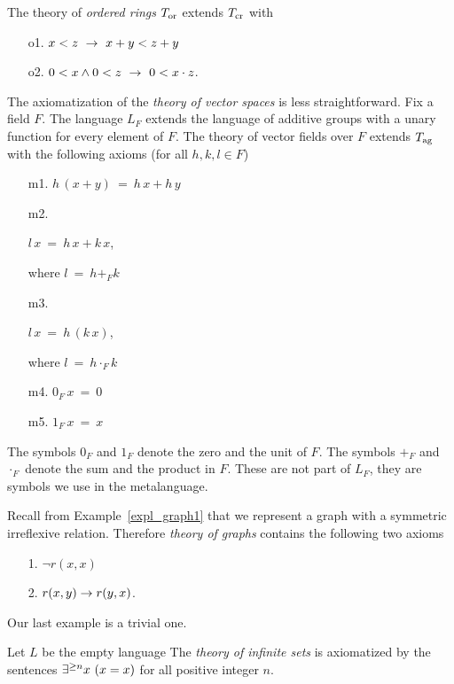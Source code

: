 \begin{example}
The theory of \emph{ordered rings} $T_{\rm or}$ extends $T_{\rm cr}$ with
\begin{itemize}
\item[o1.] $x<z\ \rightarrow\ x+y<z+y$
\item[o2.] $0<x \wedge 0<z\ \rightarrow\ 0<x\cdot z$.
\end{itemize}
\end{example}

\begin{example}\label{ex_ax_vect_sp}
The axiomatization of the \emph{theory of vector spaces\/} is less straightforward.
Fix a field $F$.
%
The language $L_F$ extends the language of additive groups with a unary function for every element of $F$.
The theory of vector fields over $F$ extends $T_{\rm ag}$ with the following axioms (for all $h,k,l\in F$)
\begin{itemize}
\item[m1.] $h\,(x+y)\ =\ h\,x+h\,y$
\item[m2.] \parbox{25ex}{$l\,x\ =\ h\,x+k\,x$,} where $l\ =\ h+_Fk$
\item[m3.] \parbox{25ex}{$l\,x\ =\ h\,(k\,x)$,} where $l\ =\ h\cdot_Fk$
\item[m4.] $0_F\,x\ =\ 0$
\item[m5.] $1_F\,x\ =\ x$
\end{itemize}
The symbols $0_F$ and $1_F$ denote the zero and the unit of $F$.
The symbols $+_F$ and $\cdot_F$ denote the sum and the product in $F$.
These are not part of $L_F$, they are symbols we use in the metalanguage.
\end{example}

\begin{example}\label{expl_Tgraphs}
Recall from Example~\ref{expl_graph1} that we represent a graph with a symmetric irreflexive relation.
Therefore \emph{theory of graphs\/} contains the following two axioms

\begin{itemize}
\item[1.] $\neg r(x,x)$
\item[2.] $r(x,y)\rightarrow r(y,x)$.
\end{itemize}
\end{example}

Our last example is a trivial one.

\begin{example}
Let $L$ be the empty language The \emph{theory of infinite sets\/} is axiomatized by the sentences $\E^{\ge n} x\ (x=x)$ for all positive integer $n$.
\end{example}


